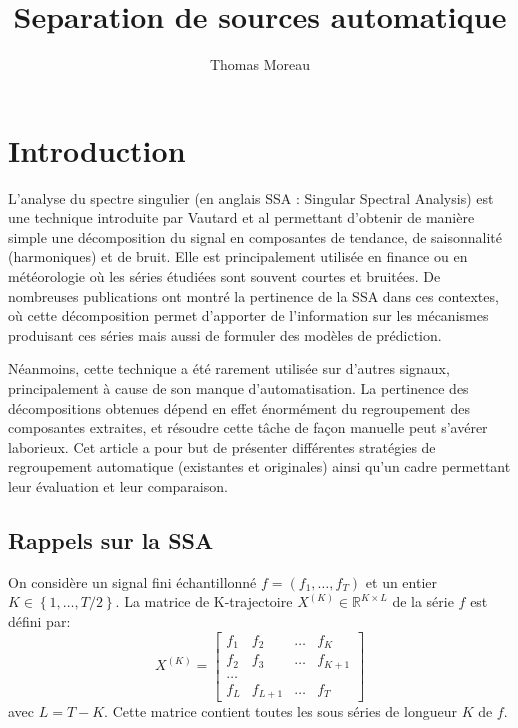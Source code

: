 \documentclass{gretsi}
\title{Separation de sources automatique}
\author{Thomas Moreau}
\date{}
\newcommand{\R}{\mathbb R}
\newcommand{\val}[3]{(#1_1 #3 \dots #3 #1_#2)}
\begin{document}
\maketitle


\section{Introduction}
\label{sec:intro}

L'analyse du spectre singulier (en anglais SSA : Singular Spectral Analysis) est une technique introduite par Vautard et al \cite{vautard_ghil_89_SSA} permettant d'obtenir de manière simple une décomposition du signal en composantes de tendance, de saisonnalité (harmoniques) et de bruit. Elle est principalement utilisée en finance ou en météorologie où les séries étudiées sont souvent courtes et bruitées. De nombreuses publications ont montré la pertinence de la SSA dans ces contextes, où cette décomposition permet d'apporter de l'information sur les mécanismes produisant ces séries mais aussi de formuler des modèles de prédiction.


Néanmoins, cette technique a été rarement utilisée sur d'autres signaux, principalement à cause de son manque d'automatisation. La pertinence des décompositions obtenues dépend en effet énormément du regroupement des composantes extraites, et résoudre cette tâche de façon manuelle peut s'avérer laborieux. Cet article a pour but de présenter différentes stratégies de regroupement automatique (existantes et originales) ainsi qu'un cadre permettant leur évaluation et leur comparaison.



\subsection{Rappels sur la SSA}
\label{sub:rap}
On considère un signal fini échantillonné $f = \val{f}{T}{,}$ et un entier $K \in \left \{ 1, \dots, T/2 \right \}$. La matrice de K-trajectoire $X^{(K)} \in \R^{K\times L}$ de la série $f$ est défini par:
$$ X^{(K)} = \begin{bmatrix}
	f_1 & f_2 &\dots & f_K\\
	f_2 & f_3 &\dots & f_{K+1}\\
	\dots\\
	f_{L} & f_{L+1} &\dots & f_T
\end{bmatrix}$$ avec $L = T-K$. Cette matrice contient toutes les sous séries de longueur $K$ de $f$.
\end{document}
